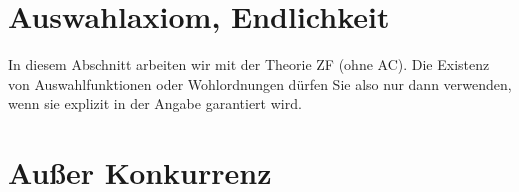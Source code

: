 \documentclass{article}
\begin{document}
\section*{Auswahlaxiom, Endlichkeit}

In diesem Abschnitt arbeiten wir mit der Theorie ZF (ohne AC). Die Existenz von
Auswahlfunktionen oder Wohlordnungen dürfen Sie also nur dann verwenden, wenn sie
explizit in der Angabe garantiert wird.





\section*{Außer Konkurrenz}


\end{document}
